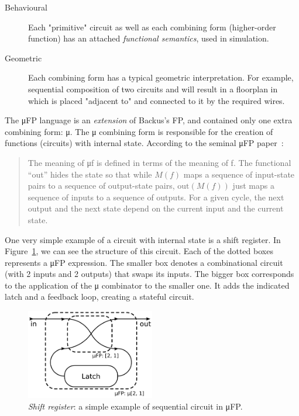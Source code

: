         \begin{description}
            \item[Behavioural]
                Each "primitive" circuit as well as each combining form (higher-order function)
                has an attached \emph{functional semantics}, used in simulation.
            \item[Geometric]
                Each combining form has a typical geometric interpretation.
                For example, sequential composition of two circuits  and  will result
                in a floorplan in which  is placed "adjacent to"  and connected to it
                by the required wires.
        \end{description}

        The μFP language is an \emph{extension} of Backus's FP, and contained only one extra combining form: μ.
        The μ combining form is responsible for the creation of functions (circuits) with internal state.
        According to the seminal μFP paper~\cite{mufp-1984}:

        \begin{quote}
            The meaning of μf is defined in terms of the meaning of f.
            The functional ``out'' hides the state
            so that while $M(f)$ maps a sequence of input-state pairs to a sequence of output-state pairs,
            $\text{out}(M(f))$ just maps a sequence of inputs to a sequence of outputs.
            For a given cycle, the next output and the next state depend on the current input and the current state.
        \end{quote}

        One very simple example of a circuit with internal state is a shift register.
        In Figure~\ref{fig:mufp-shift}, we can see the structure of this circuit.
        Each of the dotted boxes represents a μFP expression.
        The smaller box denotes a combinational circuit (with 2 inputs and 2 outputs) that swaps its inputs.
        The bigger box corresponds to the application of the μ combinator to the smaller one.
        It adds the indicated latch and a feedback loop, creating a stateful circuit.

        \begin{figure}[h]
            \centerline{\includegraphics[width=0.5\textwidth]{imgs/mufp-shift.pdf}}
            \caption{\emph{Shift register}: a simple example of sequential circuit in μFP. \label{fig:mufp-shift}}
        \end{figure}

